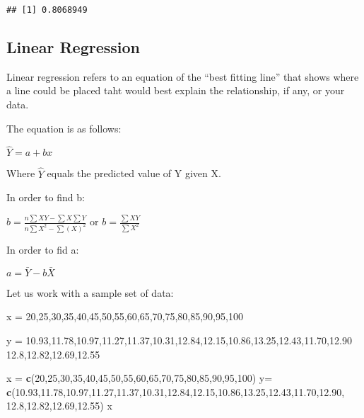 \documentclass[]{article}
\newenvironment{Shaded}{\begin{snugshade}}{\end{snugshade}}
\newcommand{\KeywordTok}[1]{\textcolor[rgb]{0.13,0.29,0.53}{\textbf{#1}}}
\newcommand{\DecValTok}[1]{\textcolor[rgb]{0.00,0.00,0.81}{#1}}
\newcommand{\FloatTok}[1]{\textcolor[rgb]{0.00,0.00,0.81}{#1}}
\newcommand{\StringTok}[1]{\textcolor[rgb]{0.31,0.60,0.02}{#1}}
\newcommand{\NormalTok}[1]{#1}
\begin{document}
\begin{verbatim}
## [1] 0.8068949
\end{verbatim}

\subsection{Linear Regression}\label{linear-regression}

Linear regression refers to an equation of the ``best fitting line''
that shows where a line could be placed taht would best explain the
relationship, if any, or your data.

The equation is as follows:

\(\hat{Y} = a + bx\)

Where \(\hat{Y}\) equals the predicted value of Y given X.

In order to find b:

\(b = \frac{n\sum XY -\sum X\sum Y }{n\sum X^2-\sum (X)^2}\) or
\(b = \frac{\sum XY }{\sum X^2}\)

In order to fid a:

\(a = \mathrel{\bar{Y}}-b\mathrel{\bar{X}}\)

Let us work with a sample set of data:

x = 20,25,30,35,40,45,50,55,60,65,70,75,80,85,90,95,100

y =
10.93,11.78,10.97,11.27,11.37,10.31,12.84,12.15,10.86,13.25,12.43,11.70,12.90
12.8,12.82,12.69,12.55

\begin{Shaded}
\begin{Highlighting}[]
\NormalTok{x =}\StringTok{ }\KeywordTok{c}\NormalTok{(}\DecValTok{20}\NormalTok{,}\DecValTok{25}\NormalTok{,}\DecValTok{30}\NormalTok{,}\DecValTok{35}\NormalTok{,}\DecValTok{40}\NormalTok{,}\DecValTok{45}\NormalTok{,}\DecValTok{50}\NormalTok{,}\DecValTok{55}\NormalTok{,}\DecValTok{60}\NormalTok{,}\DecValTok{65}\NormalTok{,}\DecValTok{70}\NormalTok{,}\DecValTok{75}\NormalTok{,}\DecValTok{80}\NormalTok{,}\DecValTok{85}\NormalTok{,}\DecValTok{90}\NormalTok{,}\DecValTok{95}\NormalTok{,}\DecValTok{100}\NormalTok{)}
\NormalTok{y=}\StringTok{ }\KeywordTok{c}\NormalTok{(}\FloatTok{10.93}\NormalTok{,}\FloatTok{11.78}\NormalTok{,}\FloatTok{10.97}\NormalTok{,}\FloatTok{11.27}\NormalTok{,}\FloatTok{11.37}\NormalTok{,}\FloatTok{10.31}\NormalTok{,}\FloatTok{12.84}\NormalTok{,}\FloatTok{12.15}\NormalTok{,}\FloatTok{10.86}\NormalTok{,}\FloatTok{13.25}\NormalTok{,}\FloatTok{12.43}\NormalTok{,}\FloatTok{11.70}\NormalTok{,}\FloatTok{12.90}\NormalTok{,}
 \FloatTok{12.8}\NormalTok{,}\FloatTok{12.82}\NormalTok{,}\FloatTok{12.69}\NormalTok{,}\FloatTok{12.55}\NormalTok{)}
\NormalTok{x}
\end{Highlighting}
\end{Shaded}
\end{document}

